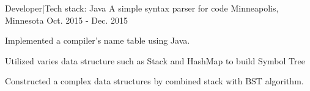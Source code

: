 \begin{cventries}
  \cventry
    {Developer\enskip|\enskip Tech stack: Java} %
    {A simple syntax parser for code} %
    {Minneapolis, Minnesota} %
    {Oct. 2015 - Dec. 2015} %
    {
      \begin{cvitems} %
        \item {Implemented a compiler’s name table using Java.}
        \item {Utilized varies data structure such as Stack and HashMap to build Symbol Tree}
        \item {Constructed a complex data structures by combined stack with BST algorithm.}
      \end{cvitems}
    }

\end{cventries}
